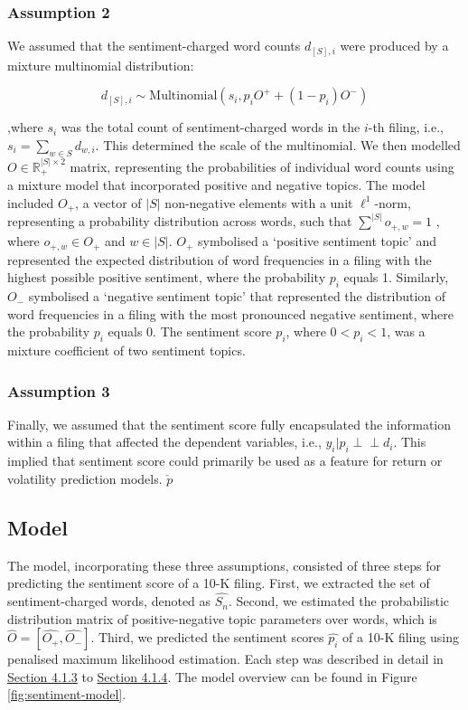 \documentclass[logo,bsc,singlespacing,parskip]{infthesis}
\begin{document}
\subsubsection{Assumption 2}
\label{subsubsec:assumption2}
We assumed that the sentiment-charged word counts $d_{[S],i}$ were produced by a mixture multinomial distribution: 

\begin{equation} \label{eu_eqn}
d_{[S],i} \sim \text{Multinomial} \left( s_{i}, p_{i}O^{+} + (1 - p_{i})O^{-} \right)
\end{equation}

,where $s_i$ was the total count of sentiment-charged words in the $i$-th filing, i.e., $s_i = \sum_{w \in S} d_{w,i}$. This determined the scale of the multinomial. We then modelled $O \in \mathbb{R}^{|S| \times 2}_+$ matrix, representing the probabilities of individual word counts using a mixture model that incorporated positive and negative topics. The model included $O_+$, a vector of $|S|$ non-negative elements with a unit $\ell^1$-norm, representing a probability distribution across words, such that $\sum_{}^{|S|} o_{+,w} = 1$
, where $o_{+,w} \in O_+$ and  $w \in |S|$. $O_+$  symbolised a ‘positive sentiment topic’ and represented the expected distribution of word frequencies in a filing with the highest possible positive sentiment, where the probability $p_i$ equals 1. Similarly, $O_-$ symbolised a ‘negative sentiment topic’ that represented the distribution of word frequencies in a filing with the most pronounced negative sentiment, where the probability $p_i$ equals 0. The sentiment score $p_i$, where $0 < p_i <1$, was a mixture coefficient of two sentiment topics.

\subsubsection{Assumption 3}
Finally, we assumed that the sentiment score fully encapsulated the information within a filing that affected the dependent variables, i.e., $y_i|p_i \perp \!\!\! \perp   d_i$. This implied that sentiment score could primarily be used as a feature for return or volatility prediction models. $\check{p}$

\subsection{Model}
\label{subsec:model}
The model, incorporating these three assumptions, consisted of three steps for predicting the sentiment score of a 10-K filing. First, we extracted the set of sentiment-charged words, denoted as $\hat{S_n}$. Second, we estimated the probabilistic distribution matrix of positive-negative topic parameters over words, which is $\hat{O}=[\hat{O_+},\hat{O_-}]$. Third, we predicted the sentiment scores $\hat{p_i}$ of a 10-K filing using penalised maximum likelihood estimation. Each step was described in detail in \hyperref[subsec:model]{Section 4.1.3} to \hyperref[subsec:new_filings]{Section 4.1.4}. The model overview can be found in Figure \ref{fig:sentiment-model}.
\end{document}
